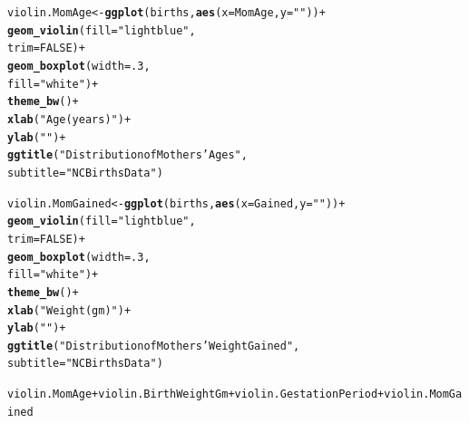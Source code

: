\documentclass{article}\usepackage[]{graphicx}\usepackage[]{xcolor}
\makeatletter
\newcommand{\hlnum}[1]{\textcolor[rgb]{0.686,0.059,0.569}{#1}}%
\newcommand{\hlstr}[1]{\textcolor[rgb]{0.192,0.494,0.8}{#1}}%
\newcommand{\hlopt}[1]{\textcolor[rgb]{0,0,0}{#1}}%
\newcommand{\hlstd}[1]{\textcolor[rgb]{0.345,0.345,0.345}{#1}}%
\newcommand{\hlkwb}[1]{\textcolor[rgb]{0.69,0.353,0.396}{#1}}%
\newcommand{\hlkwc}[1]{\textcolor[rgb]{0.333,0.667,0.333}{#1}}%
\newcommand{\hlkwd}[1]{\textcolor[rgb]{0.737,0.353,0.396}{\textbf{#1}}}%
\newenvironment{kframe}{%
 \def\at@end@of@kframe{}%
 \ifinner\ifhmode%
  \def\at@end@of@kframe{\end{minipage}}%
  \begin{minipage}{\columnwidth}%
 \fi\fi%
 \def\FrameCommand##1{\hskip\@totalleftmargin \hskip-\fboxsep
 \colorbox{shadecolor}{##1}\hskip-\fboxsep
     \hskip-\linewidth \hskip-\@totalleftmargin \hskip\columnwidth}%
 \MakeFramed {\advance\hsize-\width
   \@totalleftmargin\z@ \linewidth\hsize
   \@setminipage}}%
 {\par\unskip\endMakeFramed%
 \at@end@of@kframe}
\newenvironment{knitrout}{}{} %
\makeatother
\begin{document}
\begin{enumerate}[a.]
\begin{knitrout}
\begin{kframe}
\begin{alltt}
\hlstd{violin.MomAge} \hlkwb{<-} \hlkwd{ggplot}\hlstd{(births,} \hlkwd{aes}\hlstd{(}\hlkwc{x}\hlstd{=MomAge,} \hlkwc{y}\hlstd{=}\hlstr{""}\hlstd{))}\hlopt{+}
  \hlkwd{geom_violin}\hlstd{(}\hlkwc{fill} \hlstd{=} \hlstr{"lightblue"}\hlstd{,}
              \hlkwc{trim} \hlstd{=} \hlnum{FALSE}\hlstd{)}\hlopt{+}
  \hlkwd{geom_boxplot}\hlstd{(}\hlkwc{width} \hlstd{=} \hlnum{.3}\hlstd{,}
               \hlkwc{fill} \hlstd{=} \hlstr{"white"}\hlstd{)} \hlopt{+}
  \hlkwd{theme_bw}\hlstd{()}\hlopt{+}
  \hlkwd{xlab}\hlstd{(}\hlstr{"Age (years)"}\hlstd{)}\hlopt{+}
  \hlkwd{ylab}\hlstd{(}\hlstr{" "}\hlstd{)}\hlopt{+}
  \hlkwd{ggtitle}\hlstd{(}\hlstr{"Distribution of Mothers' Ages"}\hlstd{,}
          \hlkwc{subtitle} \hlstd{=} \hlstr{"NCBirths Data"}\hlstd{)}

\hlstd{violin.MomGained} \hlkwb{<-} \hlkwd{ggplot}\hlstd{(births,} \hlkwd{aes}\hlstd{(}\hlkwc{x}\hlstd{=Gained,} \hlkwc{y}\hlstd{=}\hlstr{""}\hlstd{))}\hlopt{+}
  \hlkwd{geom_violin}\hlstd{(}\hlkwc{fill} \hlstd{=} \hlstr{"lightblue"}\hlstd{,}
              \hlkwc{trim} \hlstd{=} \hlnum{FALSE}\hlstd{)}\hlopt{+}
  \hlkwd{geom_boxplot}\hlstd{(}\hlkwc{width} \hlstd{=} \hlnum{.3}\hlstd{,}
               \hlkwc{fill} \hlstd{=} \hlstr{"white"}\hlstd{)} \hlopt{+}
  \hlkwd{theme_bw}\hlstd{()}\hlopt{+}
  \hlkwd{xlab}\hlstd{(}\hlstr{"Weight(gm)"}\hlstd{)}\hlopt{+}
  \hlkwd{ylab}\hlstd{(}\hlstr{" "}\hlstd{)}\hlopt{+}
  \hlkwd{ggtitle}\hlstd{(}\hlstr{"Distribution of Mothers' Weight Gained"}\hlstd{,}
          \hlkwc{subtitle} \hlstd{=} \hlstr{"NCBirths Data"}\hlstd{)}

\hlstd{violin.MomAge} \hlopt{+} \hlstd{violin.BirthWeightGm} \hlopt{+} \hlstd{violin.GestationPeriod} \hlopt{+} \hlstd{violin.MomGained}
\end{alltt}
\end{kframe}
\end{knitrout}


\end{enumerate}
\end{document}
